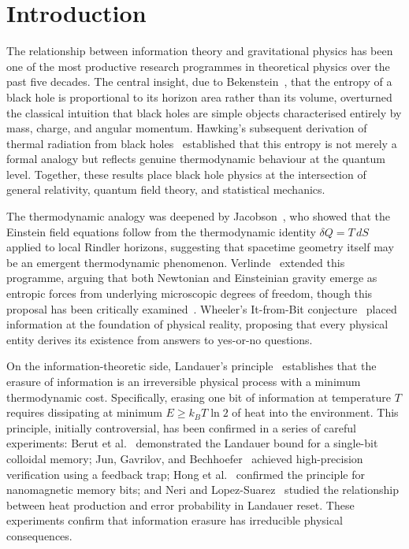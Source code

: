 \documentclass[aps,prd,twocolumn,showpacs,preprintnumbers,amsmath,amssymb,longbibliography]{revtex4-2}
\begin{document}
\section{Introduction}
\label{sec:intro}

The relationship between information theory and gravitational physics has been one of the 
most productive research programmes in theoretical physics over the past five decades. 
The central insight, due to Bekenstein~\cite{bekenstein1973}, that the entropy of a black 
hole is proportional to its horizon area rather than its volume, overturned the classical 
intuition that black holes are simple objects characterised entirely by mass, charge, and 
angular momentum. Hawking's subsequent derivation of thermal radiation from black 
holes~\cite{hawking1975} established that this entropy is not merely a formal analogy but 
reflects genuine thermodynamic behaviour at the quantum level. Together, these results place 
black hole physics at the intersection of general relativity, quantum field theory, and 
statistical mechanics.

The thermodynamic analogy was deepened by Jacobson~\cite{jacobson1995}, who showed that 
the Einstein field equations follow from the thermodynamic identity $\delta Q = T\,dS$ 
applied to local Rindler horizons, suggesting that spacetime geometry itself may be an 
emergent thermodynamic phenomenon. Verlinde~\cite{verlinde2011} extended this programme, 
arguing that both Newtonian and Einsteinian gravity emerge as entropic forces from 
underlying microscopic degrees of freedom, though this proposal has been critically 
examined~\cite{gao2010,hossenfelder2011}. Wheeler's It-from-Bit 
conjecture~\cite{wheeler1990} placed information at the foundation of physical reality, 
proposing that every physical entity derives its existence from answers to yes-or-no 
questions.

On the information-theoretic side, Landauer's principle~\cite{landauer1961} establishes 
that the erasure of information is an irreversible physical process with a minimum 
thermodynamic cost. Specifically, erasing one bit of information at temperature $T$ 
requires dissipating at minimum $E \geq k_B T \ln 2$ of heat into the environment. 
This principle, initially controversial, has been confirmed in a series of careful 
experiments: Berut et al.~\cite{berut2012} demonstrated the Landauer bound for a 
single-bit colloidal memory; Jun, Gavrilov, and Bechhoefer~\cite{jun2014} achieved 
high-precision verification using a feedback trap; Hong et al.~\cite{hong2016} confirmed 
the principle for nanomagnetic memory bits; and Neri and Lopez-Suarez~\cite{neri2016} 
studied the relationship between heat production and error probability in Landauer reset. 
These experiments confirm that information erasure has irreducible physical consequences.
\end{document}
